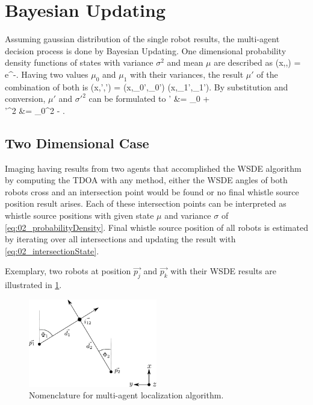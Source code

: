 \section{Bayesian Updating}
\label{sec:02_filter}

Assuming gaussian distribution of the single robot results,
the multi-agent decision process is done by Bayesian Updating.
One dimensional probability density functions of states with
variance $\sigma^2$ and mean $\mu$ are described as
\bal
    (x,\sigma,\mu) = e^{-}.
    \label{eq:02_probabilityDensity}
\eal
Having two values $\mu_0$ and $\mu_1$ with their variances,
the result $\mu'$ of the combination of both is
\bal
    (x,\sigma',\mu') = (x,\sigma_0',\mu_0') \cdot {}(x,\sigma_1',\mu_1').
    \label{eq:02_newProbabilityDensity}
\eal
By substitution and conversion, $\mu'$ and $\sigma'^2$ can be
formulated to
\bsub
\label{eq:02_intersectionState}
\bal
    \mu' &= \mu_0 + \\
    \sigma'^2 &= \sigma_0^2 - .
\eal
\esub

\subsection{Two Dimensional Case}
\label{subsec:02_2dTeam}

Imaging having results from two agents that accomplished the \ac{WSDE} algorithm by
computing the \ac{TDOA} with any method, either the \ac{WSDE} angles of both robots
cross and an intersection point would be found or no final whistle source position result arises.
Each of these intersection points can be interpreted as whistle source positions
with given state $\mu$ and variance $\sigma$ of \cref{eq:02_probabilityDensity}.
Final whistle source position of all robots is estimated by iterating over
all intersections and updating the result with \cref{eq:02_intersectionState}.

Exemplary, two robots at position $\vec{p_j}$ and $\vec{p_k}$ with their \ac{WSDE} results
are illustrated in \cref{fig:03_rays}.
\begin{figure}[ht]
	\centering
		\includegraphics[width=0.50\textwidth]{figures/rays}
    \caption[Nomenclature for multi-agent localization algorithm]
            {Nomenclature for multi-agent localization algorithm.}
    \label{fig:03_rays}
\end{figure}

